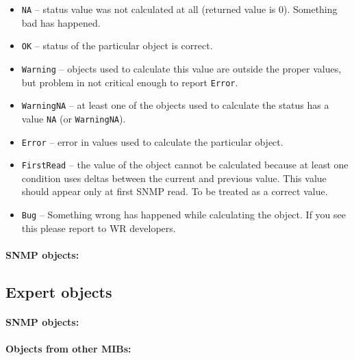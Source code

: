 \begin{itemize}%
  \item \texttt{NA} -- status value was not calculated at all (returned value
    is 0). Something bad has happened.
  \item \texttt{OK} -- status of the particular object is correct.
  \item \texttt{Warning} -- objects used to calculate this value are outside the
    proper values, but problem in not critical enough to report \texttt{Error}.
  \item \texttt{WarningNA} -- at least one of the objects used to calculate the
    status has a value \texttt{NA} (or \texttt{WarningNA}).
  \item \texttt{Error} -- error in values used to calculate the particular
    object.
  \item \texttt{FirstRead} -- the value of the object cannot be calculated
    because at least one condition uses deltas between the current and previous
    value. This value should appear only at first SNMP read. To be treated as a
    correct value.
  \item \texttt{Bug} -- Something wrong has happened while calculating the
    object. If you see this please report to WR developers.
\end{itemize}

\paragraph*{SNMP objects:}

\printnoidxglossary[type=snmp_status,title=,style=objtree,sort=def]

\newpage
\subsection{Expert objects}
\label{sec:snmp_exports:expert}

\paragraph*{SNMP objects:}
\printnoidxglossary[type=snmp_expert,style=objtree,sort=def]

\vspace{12pt}
\paragraph*{Objects from other MIBs:}
\printnoidxglossary[type=snmp_other,style=objtree,sort=def]

%
%

